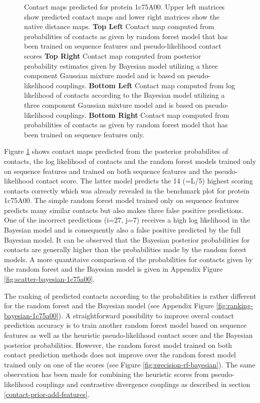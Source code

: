 \documentclass[11pt,a4paper,twoside]{book}
\theoremstyle{definition}
\theoremstyle{definition}
\theoremstyle{remark}
\begin{document}
\begin{figure}
{}

\caption{Contact maps predicted for
protein 1c75A00. Upper left matrices show predicted contact maps and
lower right matrices show the native distance maps. \textbf{Top Left}
Contact map computed from probabilities of contacts as given by random
forest model that has been trained on sequence features and
pseudo-likelihood contact scores \textbf{Top Right} Contact map computed
from posterior probability estimates given by Bayesian model utilizing a
three component Gaussian mixture model and is based on pseudo-likelihood
couplings. \textbf{Bottom Left} Contact map computed from log likelihood
of contacts according to the Bayesian model utilizing a three component
Gaussian mixture model and is based on pseudo-likelihood couplings.
\textbf{Bottom Right} Contact map computed from probabilities of
contacts as given by random forest model that has been trained on
sequence features only.}\label{fig:contacts-mpas-1c75-bayesian}
\end{figure}

Figure \ref{fig:contacts-mpas-1c75-bayesian} shows contact maps
predicted from the posterior probabilites of contacts, the log
likelihood of contacts and the random forest models trained only on
sequence features and trained on both sequence features and the
pseudo-likelihood contact score. The latter model predicts the 14 (=L/5)
highest scoring contacts correctly which was already revealed in the
benchmark plot for protein 1c75A00. The simple random forest model
trained only on sequence features predicts many similar contacts but
also makes three false positive predictions. One of the incorrect
predictions (i=27, j=7) receives a high log likelihood in the Bayesian
model and is consequently also a false positive predicted by the full
Bayesian model. It can be observed that the Bayesian posterior
probabilities for contacts are generally higher than the probabilities
made by the random forest models. A more quantitaive comparison of the
probabilities for contacts given by the random forest and the Bayesian
model is given in Appendix Figure \ref{fig:scatter-bayesian-1c75a00}.

The ranking of predicted contacts according to the probabilities is
rather different for the random forest and the Bayesian model (see
Appendix Figure \ref{fig:ranking-bayesian-1c75a00}). A straightforward
possibility to improve overal contact prediction accuracy is to train
another random forest model based on sequence features as well as the
heuristic pseudo-likelihood contact score and the Bayesian posterior
probabilities. However, the random forest model trained on both contact
prediction methods does not improve over the random forest model trained
only on one of the scores (see Figure \ref{fig:precision-rf-bayesian}).
The same observation has been made for combining the heuristic scores
from pseudo-likelihood couplings and contrastive divergence couplings as
described in section \ref{contact-prior-add-features}.
\end{document}
